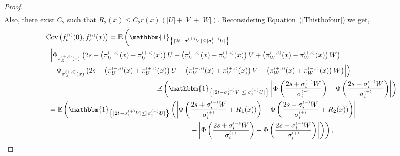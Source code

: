 \documentclass[12pt]{article}
\theoremstyle{Theorem}
\begin{document}
\begin{proof}
{\begin{align*}
\end{align*}}
Also, there exist $C_2$ such that $R_{2}(x) \leq C_{2}r(x)\left(|U| + |V| + |W|\right)$. 
Reconsidering Equation~(\ref{Thisthofour}) we get,
\pagebreak
{\small
\begin{align*}
 \text{Cov}\left(f_{t}^{\scriptscriptstyle(1)}(0), f_{s}^{\scriptscriptstyle(i)}(x) \right) & =  \mathbb{E}\left(\mathbbm{1}_{\left\{ |2t - \sigma^{\scriptscriptstyle (+)}_{1}V| \leq |\sigma^{\scriptscriptstyle (-)}_{1}U|\right\}}\right. \\
&\hspace{-3cm} \left. \left|\Phi_{ \pi^{\scriptscriptstyle(+, i)}_{Z}(x)}\left( 2s + \left( \pi^{\scriptscriptstyle(-, i)}_{U}(x)- \pi^{\scriptscriptstyle(+, i)}_{U}(x)\right) U + \left(\pi^{\scriptscriptstyle(-, i)}_{V}(x)- \pi^{\scriptscriptstyle(+, i)}_{V}(x)\right)V + \left(\pi^{\scriptscriptstyle(-, i)}_{W}(x) - \pi^{\scriptscriptstyle(+, i)}_{W}(x)\right) W \right) \right. \right.  \nonumber \\
& \hspace{-3cm}\left. \left.  - \Phi_{ \pi^{\scriptscriptstyle(+, i)}_{Z}(x)}\left( 2s - \left( \pi^{\scriptscriptstyle(-, i)}_{U}(x)+ \pi^{\scriptscriptstyle(+, i)}_{U}(x)\right) U - \left(\pi^{\scriptscriptstyle(-, i)}_{V}(x)+ \pi^{\scriptscriptstyle(+, i)}_{V}(x)\right)V   - \left( \pi^{\scriptscriptstyle(+, i)}_{W}(x) +  \pi^{\scriptscriptstyle(-, i)}_{W}(x) \right)W \right)  \right| \right) \\
& \hspace{2cm} - \mathbb{E}\left(\mathbbm{1}_{\left\{ |2t - \sigma^{\scriptscriptstyle (+)}_{1}V| \leq |\sigma^{\scriptscriptstyle (-)}_{1}U|\right\}}\left|\Phi\left(\frac{2s + \sigma^{\scriptscriptstyle (-)}_{i}W}{\sigma^{\scriptscriptstyle (+)}_{i}} \right) - \Phi\left(\frac{2s -\sigma^{\scriptscriptstyle (-)}_{i}W }{\sigma^{\scriptscriptstyle (+)}_{i}} \right)\right|\right)\\
& \hspace{-3cm} = \mathbb{E}\left(\mathbbm{1}_{\left\{ |2t - \sigma^{\scriptscriptstyle (+)}_{1}V| \leq |\sigma^{\scriptscriptstyle (-)}_{1}U|\right\}} \left(\left|\Phi\left(\frac{2s + \sigma^{\scriptscriptstyle (-)}_{i}W}{\sigma^{\scriptscriptstyle (+)}_{i}} + R_{1}(x)) \right) - \Phi\left(\frac{2s -\sigma^{\scriptscriptstyle (-)}_{i}W }{\sigma^{\scriptscriptstyle (+)}_{i}} + R_{2}(x))\right)\right| \right. \right. \\
& \hspace{4cm} \left.\left. -  \left|\Phi\left(\frac{2s + \sigma^{\scriptscriptstyle (-)}_{i}W}{\sigma^{\scriptscriptstyle (+)}_{i}} \right) - \Phi\left(\frac{2s -\sigma^{\scriptscriptstyle (-)}_{i}W }{\sigma^{\scriptscriptstyle (+)}_{i}} \right)\right| \right)\right),

\end{align*}}
\end{proof}
\end{document}
